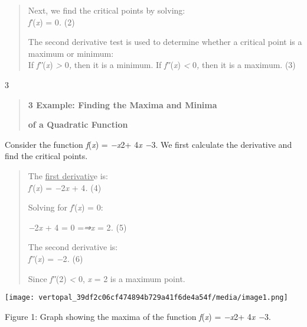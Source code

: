 \documentclass[
]{article}
\begin{document}
\begin{quote}
Next, we find the critical points by solving:\\
\emph{f′}(\emph{x}) = 0\emph{.} (2)

The second derivative test is used to determine whether a critical point
is a maximum or minimum:\\
If \emph{f′′}(\emph{x}) \emph{\textgreater{}} 0\emph{,} then it is a
minimum. If \emph{f′′}(\emph{x}) \emph{\textless{}} 0\emph{,} then it is
a maximum. (3)
\end{quote}

3

\begin{quote}
\textbf{3 Example: Finding the Maxima and Minima}

\textbf{of a Quadratic Function}
\end{quote}

Consider the function \emph{f}(\emph{x}) = \emph{−x}2+ 4\emph{x −}3. We
first calculate the derivative and find the critical points.

\begin{quote}
The \uline{first derivativ}e is:\\
\emph{f′}(\emph{x}) = \emph{−}2\emph{x} + 4\emph{.} (4)

Solving for \emph{f′}(\emph{x}) = 0:

\emph{−}2\emph{x} + 4 = 0 =\emph{⇒x} = 2\emph{.} (5)

The second derivative is:\\
\emph{f′′}(\emph{x}) = \emph{−}2\emph{.} (6)

Since \emph{f′′}(2) \emph{\textless{}} 0, \emph{x} = 2 is a maximum
point.
\end{quote}

\texttt{[image: vertopal\_39df2c06cf474894b729a41f6de4a54f/media/image1.png]}

Figure 1: Graph showing the maxima of the function \emph{f}(\emph{x}) =
\emph{−x}2+ 4\emph{x −}3.
\end{document}

